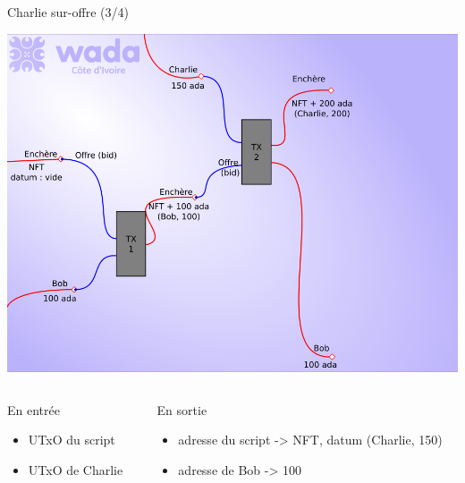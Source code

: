 \documentclass[presentation]{beamer}
\begin{document}
\begin{frame}[label={sec:orga791965}]{Charlie sur-offre (3/4)}
\begin{center}
\includegraphics[height=.55\textheight]{Images/enchere_03.png}
\end{center}

\begin{columns}
\begin{column}{0.3\columnwidth}
\begin{block}{En entrée}
\begin{itemize}
\item UTxO du script
\item UTxO de Charlie
\end{itemize}
\end{block}
\end{column}
\begin{column}{0.7\columnwidth}
\begin{block}{En sortie}
\begin{itemize}
\item adresse du script -> NFT, datum (Charlie, 150)
\item adresse de Bob -> 100
\end{itemize}
\end{block}
\end{column}
\end{columns}
\end{frame}
\end{document}
